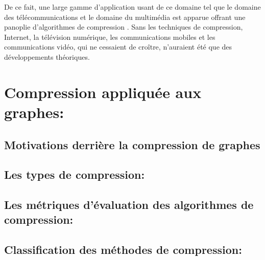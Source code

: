 \documentclass[11pt,a4paper]{report}
\theoremstyle{definition}
\begin{document}
	De ce fait, une large gamme d'application usant de ce domaine tel que le domaine des télécommunications et le domaine du multimédia est apparue offrant une panoplie d'algorithmes de compression \citep{sethi2014data}. Sans les techniques de compression, Internet, la télévision numérique, les communications mobiles et les communications vidéo, qui ne cessaient de croître, n'auraient été que des développements théoriques.
	
		
		
		
	
	
		
		
		\section{Compression appliquée aux graphes:}
	
			\subsection{Motivations derrière la compression de graphes }
	
			\subsection{Les types de compression:}
	
			\subsection{Les métriques d'évaluation des algorithmes de compression:}
			
			\subsection{Classification des méthodes de compression:}
			
\end{document}

